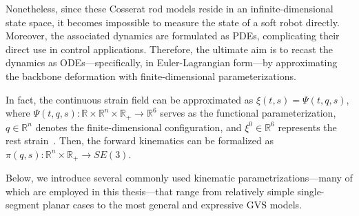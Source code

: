 Nonetheless, since these Cosserat rod models reside in an infinite-dimensional state space, it becomes impossible to measure the state of a soft robot directly. Moreover, the associated dynamics are formulated as \glspl{PDE}, complicating their direct use in control applications. Therefore, the ultimate aim is to recast the dynamics as \glspl{ODE}—specifically, in Euler-Lagrangian form—by approximating the backbone deformation with finite-dimensional parameterizations.

In fact, the continuous strain field can be approximated as $\xi(t,s) = \Psi(t,q,s)$,
where $\Psi(t,q,s): \mathbb{R} \times \mathbb{R}^n \times \mathbb{R}_+ \to \mathbb{R}^6$ serves as the functional parameterization, $q \in \mathbb{R}^n$ denotes the finite-dimensional configuration, and $\xi^0 \in \mathbb{R}^6$ represents the rest strain~\citep{mathew2025reduced}. Then, the forward kinematics can be formalized as
$\pi(q,s): \mathbb{R}^n \times \mathbb{R}_+ \to SE(3)$.

Below, we introduce several commonly used kinematic parametrizations—many of which are employed in this thesis—that range from relatively simple single-segment planar cases to the most general and expressive \gls{GVS} models.

